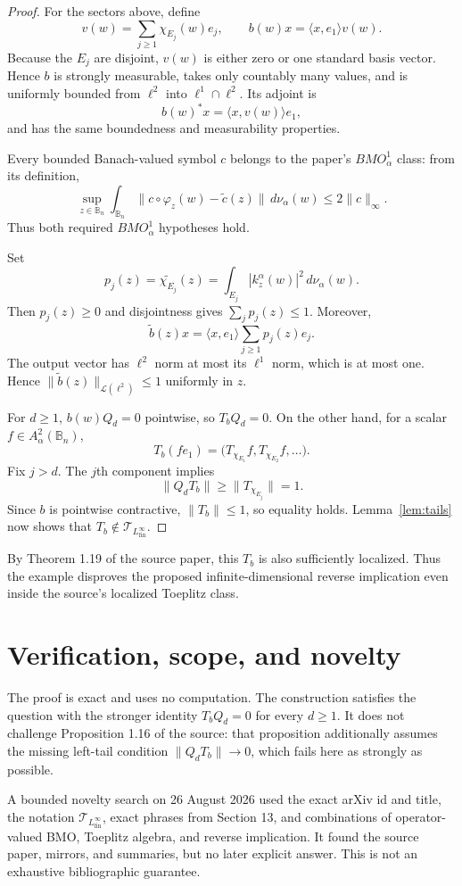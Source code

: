 \documentclass[11pt]{article}
\newcommand{\Bn}{\mathbb B_n}
\newcommand{\A}{A^2_\alpha(\Bn)}
\newcommand{\BMO}{BMO^1_\alpha}
\newcommand{\Tfin}{\mathcal T_{L^\infty_{\mathrm{fin}}}}
\newcommand{\cL}{\mathcal L}
\begin{document}
\begin{proof}
For the sectors above, define
\[
 v(w)=\sum_{j\geq1}\chi_{E_j}(w)e_j,
 \qquad
 b(w)x=\langle x,e_1\rangle v(w).
\]
Because the $E_j$ are disjoint, $v(w)$ is either zero or one standard basis
vector.  Hence $b$ is strongly measurable, takes only countably many values,
and is uniformly bounded from $\ell^2$ into $\ell^1\cap\ell^2$.  Its adjoint is
\[
 b(w)^*x=\langle x,v(w)\rangle e_1,
\]
and has the same boundedness and measurability properties.

Every bounded Banach-valued symbol $c$ belongs to the paper's $\BMO$ class:
from its definition,
\[
 \sup_{z\in\Bn}\int_{\Bn}
 \|c\circ\varphi_z(w)-\widetilde c(z)\|\,d\nu_\alpha(w)
 \leq2\|c\|_\infty.
\]
Thus both required $\BMO$ hypotheses hold.

Set
\[
 p_j(z)=\widetilde{\chi_{E_j}}(z)
 =\int_{E_j}|k_z^\alpha(w)|^2\,d\nu_\alpha(w).
\]
Then $p_j(z)\geq0$ and disjointness gives $\sum_jp_j(z)\leq1$.  Moreover,
\[
 \widetilde b(z)x
 =\langle x,e_1\rangle\sum_{j\geq1}p_j(z)e_j.
\]
The output vector has $\ell^2$ norm at most its $\ell^1$ norm, which is at
most one.  Hence $\|\widetilde b(z)\|_{\cL(\ell^2)}\leq1$ uniformly in $z$.

For $d\geq1$, $b(w)Q_d=0$ pointwise, so $T_bQ_d=0$.  On the other hand, for a
scalar $f\in\A$,
\[
 T_b(fe_1)=\bigl(T_{\chi_{E_1}}f,
 T_{\chi_{E_2}}f,\ldots\bigr).
\]
Fix $j>d$.  The $j$th component implies
\[
 \|Q_dT_b\|\geq\|T_{\chi_{E_j}}\|=1.
\]
Since $b$ is pointwise contractive, $\|T_b\|\leq1$, so equality holds.
Lemma~\ref{lem:tails} now shows that $T_b\notin\Tfin$.
\end{proof}

By Theorem 1.19 of the source paper, this $T_b$ is also sufficiently localized.
Thus the example disproves the proposed infinite-dimensional reverse
implication even inside the source's localized Toeplitz class.

\section{Verification, scope, and novelty}

The proof is exact and uses no computation.  The construction satisfies the
question with the stronger identity $T_bQ_d=0$ for every $d\geq1$.  It does
not challenge Proposition 1.16 of the source: that proposition additionally
assumes the missing left-tail condition $\|Q_dT_b\|\to0$, which fails here as
strongly as possible.

A bounded novelty search on 26 August 2026 used the exact arXiv id and title,
the notation $\Tfin$, exact phrases from Section 13, and combinations of
operator-valued BMO, Toeplitz algebra, and reverse implication.  It found the
source paper, mirrors, and summaries, but no later explicit answer.  This is
not an exhaustive bibliographic guarantee.
\end{document}

